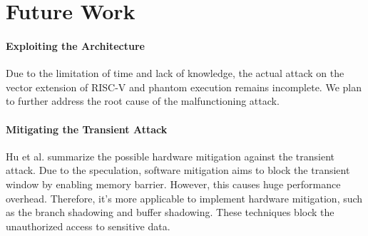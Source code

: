 \section{Future Work}
\paragraph{Exploiting the Architecture}
Due to the limitation of time and lack of knowledge, the actual attack on the vector extension of RISC-V and phantom execution remains incomplete.
We plan to further address the root cause of the malfunctioning attack.

\paragraph{Mitigating the Transient Attack}
Hu et al.\cite{sok} summarize the possible hardware mitigation against the transient attack. 
Due to the speculation, software mitigation aims to block the transient window by enabling memory barrier. 
However, this causes huge performance overhead. Therefore, it's more applicable to implement hardware mitigation, such as the
branch shadowing and buffer shadowing. These techniques block the unauthorized access to sensitive data.